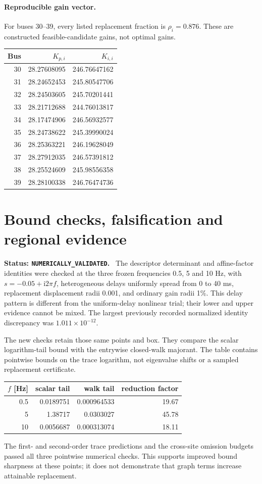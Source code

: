 \documentclass[11pt]{article}
\newcommand{\ii}{\mathrm{i}}
\newcommand{\status}[1]{\par\smallskip\noindent\textbf{Status: \texttt{#1}.}\ }
\begin{document}
\paragraph{Reproducible gain vector.}
For buses 30--39, every listed replacement fraction is $\rho_i=0.876$.
These are constructed feasible-candidate gains, not optimal gains.
\begin{center}\small
\begin{tabular}{rrr}\toprule
Bus & $K_{p,i}$ & $K_{i,i}$\\\midrule
30 & 28.27608095 & 246.76647162\\
31 & 28.24652453 & 245.80547706\\
32 & 28.24503605 & 245.70201441\\
33 & 28.21712688 & 244.76013817\\
34 & 28.17474906 & 246.56932577\\
35 & 28.24738622 & 245.39990024\\
36 & 28.25363221 & 246.19628049\\
37 & 28.27912035 & 246.57391812\\
38 & 28.25524609 & 245.98556358\\
39 & 28.28100338 & 246.76474736\\
\bottomrule\end{tabular}\end{center}

\section{Bound checks, falsification and regional evidence}
\label{sec:boundchecks}
\status{NUMERICALLY\_VALIDATED}
The descriptor determinant and affine-factor identities were checked
at the three frozen frequencies 0.5, 5 and 10 Hz, with
$s=-0.05+\ii 2\pi f$, heterogeneous delays uniformly spread from
0 to 40 ms, replacement displacement radii 0.001, and ordinary gain
radii 1\%. This delay pattern is different from the uniform-delay
nonlinear trial; their lower and upper evidence cannot be mixed.
The largest previously recorded normalized identity discrepancy was
$1.011\times10^{-12}$.

The new checks retain those same points and box. They compare the
scalar logarithm-tail bound with the entrywise closed-walk majorant.
The table contains pointwise bounds on the trace logarithm, not
eigenvalue shifts or a sampled replacement certificate.
\begin{center}\small
\begin{tabular}{rrrr}\toprule
$f$ [Hz] & scalar tail & walk tail & reduction factor\\\midrule
0.5 & 0.0189751 & 0.000964533 & 19.67\\
5 & 1.38717 & 0.0303027 & 45.78\\
10 & 0.0056687 & 0.000313074 & 18.11\\
\bottomrule\end{tabular}\end{center}
The first- and second-order trace predictions and the cross-site
omission budgets passed all three pointwise numerical checks.
This supports improved bound sharpness at these points; it does
not demonstrate that graph terms increase attainable replacement.
\end{document}
